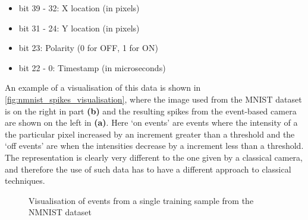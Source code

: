 \begin{itemize}
      \item bit 39 - 32: X location (in pixels)
      \item bit 31 - 24: Y location (in pixels)
      \item bit 23: Polarity (0 for OFF, 1 for ON)
      \item bit 22 - 0: Timestamp (in microseconds)
\end{itemize}

An example of a visualisation of this data is shown in \autoref{fig:nmnist_spikes_visualisation}, where the image used from the MNIST dataset is on the right in part \textbf{(b)} and the resulting spikes from the event-based camera are shown on the left in \textbf{(a)}. Here `on events' are events where the intensity of a the particular pixel increased by an increment greater than a threshold and the `off events' are when the intensities decrease by a increment less than a threshold. The representation is clearly very different to the one given by a classical camera, and therefore the use of such data has to have a different approach to classical techniques.

\begin{figure}[htb]%
      \centering
      \qquad
      \caption{Visualisation of events from a single training sample from the NMNIST dataset}%
      \label{fig:nmnist_spikes_visualisation}%
\end{figure}

